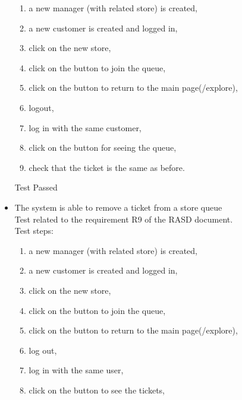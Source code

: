 \begin{itemize}
\begin{enumerate}
        \item a new manager (with related store) is created,

        \item a new customer is created and logged in,

        \item click on the new store,

        \item click on the button to join the queue,

        \item click on the button to return to the main page(/explore),

        \item logout,

        \item log in with the same customer,

        \item click on the button for seeing the queue,

        \item check that the ticket is the same as before.
    \end{enumerate}
    Test Passed

    \item The system is able to remove a ticket from a store queue \\
    Test related to the requirement R9 of the RASD document. \\
    Test steps:\\
    \begin{enumerate}
        \item a new manager (with related store) is created,

        \item a new customer is created and logged in,

        \item click on the new store,

        \item click on the button to join the queue,

        \item click on the button to return to the main page(/explore),

        \item log out,

        \item log in with the same user,

        \item click on the button to see the tickets,


\end{enumerate}
\end{itemize}
